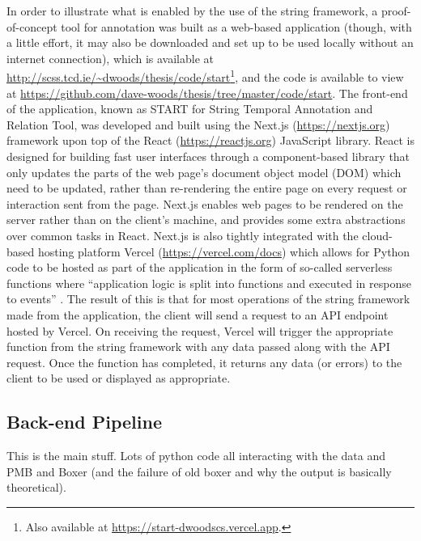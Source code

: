 \documentclass[a4paper,12pt,leqno]{article}
\newcommand{\nb}[1]{{\color{red}[NB\footnote{{\color{red}#1}}]}}
\begin{document}
In order to illustrate what is enabled by the use of the string framework, a proof-of-concept tool for annotation was built as a web-based application (though, with a little effort, it may also be downloaded and set up to be used locally without an internet connection), which is available at \url{http://scss.tcd.ie/~dwoods/thesis/code/start}\footnote{Also available at \url{https://start-dwoodscs.vercel.app}.}, and the code is available to view at \url{https://github.com/dave-woods/thesis/tree/master/code/start}. The front-end of the application, known as START for String Temporal Annotation and Relation Tool, was developed and built using the Next.js (\url{https://nextjs.org}) framework upon top of the React (\url{https://reactjs.org}) JavaScript library. React is designed for building fast user interfaces through a component-based library that only updates the parts of the web page's document object model (DOM) which need to be updated, rather than re-rendering the entire page on every request or interaction sent from the page. Next.js enables web pages to be rendered on the server rather than on the client's machine, and provides some extra abstractions over common tasks in React. Next.js is also tightly integrated with the cloud-based hosting platform Vercel (\url{https://vercel.com/docs}) which allows for Python code to be hosted as part of the application in the form of so-called serverless functions \citep{anderson1995serverless} where ``application logic is split into functions and executed in response to events'' \citep[p. 405]{mcgrath2017serverless}. The result of this is that for most operations of the string framework made from the application, the client will send a request to an API endpoint hosted by Vercel. On receiving the request, Vercel will trigger the appropriate function from the string framework with any data passed along with the API request. Once the function has completed, it returns any data (or errors) to the client to be used or displayed as appropriate.


\subsection{Back-end Pipeline}\label{sub:backend} %
This is the main stuff. Lots of python code all interacting with the data and PMB and Boxer (and the failure of old boxer and why the output is basically theoretical).
\end{document}
